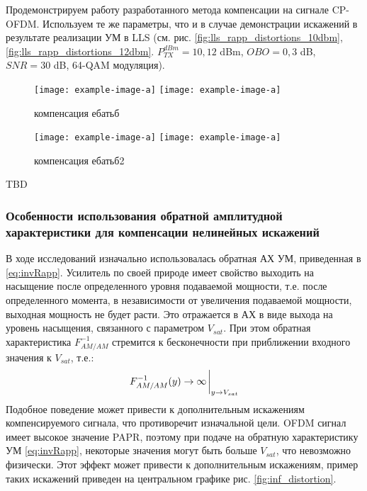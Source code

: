 Продемонстрируем работу разработанного метода компенсации на сигнале
CP-OFDM. Используем те же параметры, что и в случае демонстрации искажений
в результате реализации УМ в LLS (см. рис.
\ref{fig:lls_rapp_distortions_10dbm}, \ref{fig:lls_rapp_distortions_12dbm}.
$P^{dBm}_{TX} = 10,12$ dBm, $OBO = 0,3$ dB, $SNR=30$ dB, 64-QAM модуляция). 

\begin{figure}[h!]
    \centering
    \texttt{[image: example-image-a]}
    \texttt{[image: example-image-a]}
    \caption{компенсация ебатьб}
    \label{fig:comp1}
\end{figure}
\begin{figure}[h!]
    \centering
    \texttt{[image: example-image-a]}
    \texttt{[image: example-image-a]}
    \caption{компенсация ебатьб2}
    \label{fig:comp2}
\end{figure}

TBD




\subsubsection{Особенности использования обратной амплитудной
характеристики для компенсации нелинейных искажений}
В ходе исследований изначально использовалась обратная АХ УМ, приведенная в
\ref{eq:invRapp}. Усилитель по своей природе имеет свойство выходить на
насыщение после определенного уровня подаваемой мощности, т.е. после
определенного момента, в независимости от увеличения подаваемой мощности,
выходная мощность не будет расти. Это отражается в АХ в виде выхода на
уровень насыщения, связанного с параметром $V_{sat}$. При этом обратная
характеристика $F^{-1}_{AM/AM}$ стремится к бесконечности при приближении
входного значения к $V_{sat}$, т.е.:
\begin{equation}
    F^{-1}_{AM/AM}(y) \rightarrow \infty \eval_{y \rightarrow V_{sat}}
\end{equation}
Подобное поведение может привести к дополнительным искажениям
компенсируемого сигнала, что противоречит изначальной цели. OFDM сигнал
имеет высокое значение PAPR, поэтому при подаче на обратную характеристику
УМ \ref{eq:invRapp}, некоторые значения могут быть больше $V_{sat}$, что
невозможно физически. Этот эффект может привести к дополнительным
искажениям, пример таких искажений приведен на центральном графике рис.
\ref{fig:inf_distortion}.

